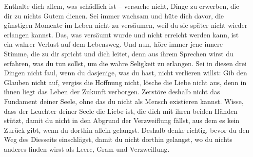 Enthalte dich allem, was schädlich ist -- versuche nicht, Dinge zu erwerben, die dir zu nichts Gutem dienen. Sei immer wachsam und hüte dich davor, die günstigen Momente im Leben nicht zu versäumen, weil du sie später nicht wieder erlangen kannst. Das, was versäumt wurde und nicht erreicht werden kann, ist ein wahrer Verlust auf dem Lebensweg. Und nun, höre immer jene innere Stimme, die zu dir spricht und dich leitet, denn aus ihrem Sprechen wirst du erfahren, was du tun sollst, um die wahre Seligkeit zu erlangen. Sei in diesen drei Dingen nicht faul, wenn du dasjenige, was du hast, nicht verlieren willst: Gib den Glauben nicht auf, vergiss die Hoffnung nicht, lösche die Liebe nicht aus, denn in ihnen liegt das Leben der Zukunft verborgen. Zerstöre deshalb nicht das Fundament deiner Seele, ohne das du nicht als Mensch existieren kannst. Wisse, dass der Leuchter deiner Seele die Liebe ist, die dich mit ihren beiden Händen stützt, damit du nicht in den Abgrund der Verzweiflung fällst, aus dem es kein Zurück gibt, wenn du dorthin allein gelangst. Deshalb denke richtig, bevor du den Weg des Diesseits einschlägst, damit du nicht dorthin gelangst, wo du nichts anderes finden wirst als Leere, Gram und Verzweiflung.


